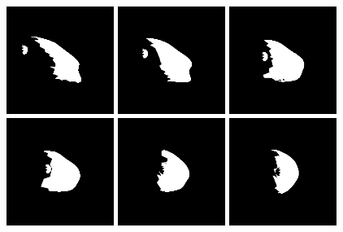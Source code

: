 \documentclass[11pt]{article}
\begin{document}
\begin{figure}[p]
\centering
\includegraphics[width=3.5cm]{figs/22_test48_update2/output.0001.syn.png}
\includegraphics[width=3.5cm]{figs/22_test48_update2/output.0002.syn.png}
\includegraphics[width=3.5cm]{figs/22_test48_update2/output.0003.syn.png}
\includegraphics[width=3.5cm]{figs/22_test48_update2/output.0004.syn.png}
\includegraphics[width=3.5cm]{figs/22_test48_update2/output.0005.syn.png}
\includegraphics[width=3.5cm]{figs/22_test48_update2/output.0006.syn.png}

\end{figure}
\end{document}
